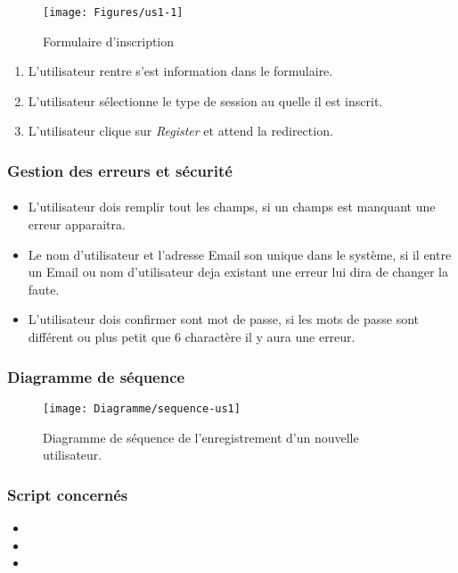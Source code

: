 \begin{figure}[h]
	\texttt{[image: Figures/us1-1]}
	\caption{Formulaire d'inscription}
\end{figure}

\vspace{\baselineskip}
\begin{enumerate}
	\item L'utilisateur rentre s'est information dans le formulaire. 
	\item L'utilisateur sélectionne le type de session au quelle il est inscrit. 
	\item L'utilisateur clique sur \textit{Register} et attend la redirection. 
\end{enumerate}

\newpage
\subsubsection{Gestion des erreurs et sécurité}
	\paragraph{}
		\begin{itemize}
			\item L'utilisateur dois remplir tout les champs, si un champs est manquant une erreur apparaitra. 
			\item Le nom d'utilisateur et l'adresse Email son unique dans le système, si il entre un Email ou nom d'utilisateur deja existant une erreur lui dira de changer la faute.
			\item L'utilisateur dois confirmer sont mot de passe, si les mots de passe sont différent ou plus petit que 6 charactère il y aura une erreur.
		\end{itemize}
		
\subsubsection{Diagramme de séquence}
	\begin{figure}[h]
		\texttt{[image: Diagramme/sequence-us1]}
		\caption{Diagramme de séquence de l'enregistrement d'un nouvelle utilisateur. }
	\end{figure}
	
	
\subsubsection{Script concernés}
	\begin{itemize}
		\item {}
		\item {}
		\item {}
	\end{itemize}